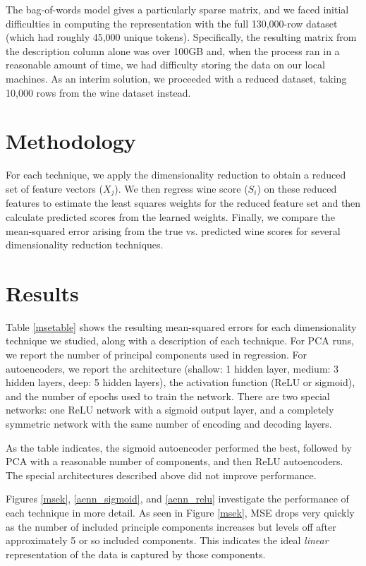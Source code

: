 \documentclass{article}
\begin{document}
The bag-of-words model gives a particularly sparse matrix, and we faced initial difficulties in computing the representation with the full 130,000-row dataset (which had roughly 45,000 unique tokens). Specifically, the resulting matrix from the description column alone was over 100GB and, when the process ran in a reasonable amount of time, we had difficulty storing the data on our local machines. As an interim solution, we proceeded with a reduced dataset, taking 10,000 rows from the wine dataset instead. 

\section{Methodology}
For each technique, we apply the dimensionality reduction to obtain a reduced set of feature vectors ($X_j$). We then regress wine score ($S_i$) on these reduced features to estimate the least squares weights for the reduced feature set and then calculate predicted scores from the learned weights. Finally, we compare the mean-squared error arising from the true vs. predicted wine scores for several dimensionality reduction techniques.

\section{Results}
Table \ref{msetable} shows the resulting mean-squared errors for each dimensionality technique we studied, along with a description of each technique. For PCA runs, we report the number of principal components used in regression. For autoencoders, we report the architecture (shallow: 1 hidden layer, medium: 3 hidden layers, deep: 5 hidden layers), the activation function (ReLU or sigmoid), and the number of epochs used to train the network. There are two special networks: one ReLU network with a sigmoid output layer, and a completely symmetric network with the same number of encoding and decoding layers. 

As the table indicates, the sigmoid autoencoder performed the best, followed by PCA with a reasonable number of components, and then ReLU autoencoders. The special architectures described above did not improve performance.

Figures \ref{msek}, \ref{aenn_sigmoid}, and \ref{aenn_relu} investigate the performance of each technique in more detail. As seen in Figure \ref{msek}, MSE drops very quickly as the number of included principle components increases but levels off after approximately 5 or so included components. This indicates the ideal \emph{linear} representation of the data is captured by those components.
\end{document}
